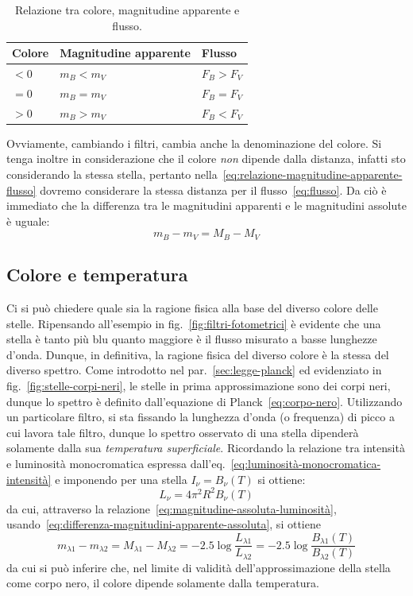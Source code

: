 \begin{table}
\caption{Relazione tra colore, magnitudine apparente e flusso.}
\label{tab:colore}
\centering
\begin{tabular}{lll}
\toprule
Colore & Magnitudine apparente & Flusso \\
\midrule
$<0$ & $m_B < m_V$ & $F_B > F_V$ \\
$=0$ & $m_B = m_V$ & $F_B = F_V$ \\
$>0$ & $m_B > m_V$ & $F_B < F_V$ \\
\bottomrule
\end{tabular}
\end{table}

Ovviamente, cambiando i filtri, cambia anche la denominazione del colore. Si tenga inoltre in considerazione che il colore \emph{non} dipende dalla distanza, infatti sto considerando la stessa stella, pertanto nella~\eqref{eq:relazione-magnitudine-apparente-flusso} dovremo considerare la stessa distanza per il flusso~\eqref{eq:flusso}. Da ciò è immediato che la differenza tra le magnitudini apparenti e le magnitudini assolute è uguale:
\begin{equation}\label{eq:differenza-magnitudini-apparente-assoluta}
    m_B-m_V = M_B-M_V
\end{equation}

\subsection{Colore e temperatura}
Ci si può chiedere quale sia la ragione fisica alla base del diverso colore delle stelle. Ripensando all'esempio in fig.~\ref{fig:filtri-fotometrici} è evidente che una stella è tanto più blu quanto maggiore è il flusso misurato a basse lunghezze d'onda. Dunque, in definitiva, la ragione fisica del diverso colore è la stessa del diverso spettro. Come introdotto nel par.~\ref{sec:legge-planck} ed evidenziato in fig.~\ref{fig:stelle-corpi-neri}, le stelle in prima approssimazione sono dei corpi neri, dunque lo spettro è definito dall'equazione di Planck~\eqref{eq:corpo-nero}. Utilizzando un particolare filtro, si sta fissando la lunghezza d'onda (o frequenza) di picco a cui lavora tale filtro, dunque lo spettro osservato di una stella dipenderà solamente dalla sua \emph{temperatura superficiale}. Ricordando la relazione tra intensità e luminosità monocromatica espressa dall'eq.~\eqref{eq:luminosità-monocromatica-intensità} e imponendo per una stella $I_\nu = B_\nu (T)$ si ottiene:
\[
    L_\nu = 4 {\pi}^2 R^2 B_\nu (T)
\]
da cui, attraverso la relazione~\eqref{eq:magnitudine-assoluta-luminosità}, usando~\eqref{eq:differenza-magnitudini-apparente-assoluta}, si ottiene
\[
    m_{\lambda 1} - m_{\lambda 2} = M_{\lambda 1} - M_{\lambda 2} = -2.5 \log\frac{L_{\lambda 1}}{L_{\lambda 2}} = -2.5 \log\frac{B_{\lambda 1}(T)}{B_{\lambda 2}(T)}
\]
da cui si può inferire che, nel limite di validità dell'approssimazione della stella come corpo nero, il colore dipende solamente dalla temperatura.


